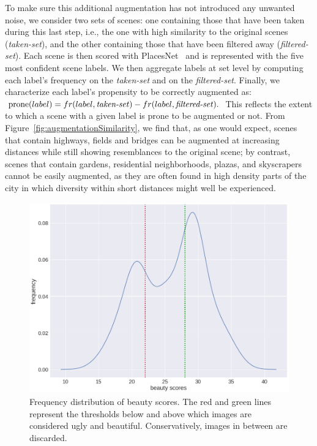 To make sure this additional augmentation has not introduced any unwanted noise, we consider  two sets of scenes: one containing those that have been taken during this last step, i.e., the one with high similarity to the original scenes (\emph{taken-set}), and the other containing those that have been filtered away (\emph{filtered-set}). Each scene is then scored with PlacesNet~\cite{zhou2014learning} and is represented with the five most confident scene labels. We then aggregate labels at set level by computing each label's frequency on the \emph{taken-set} %
and on the \emph{filtered-set}. Finally, we characterize each label's propensity to be correctly augmented as: 
$ \textrm{prone}(label)= fr(label,\textrm{\emph{taken-set}}) - fr(label,\textrm{\emph{filtered-set}}).$
This reflects the extent to which a scene with a given label is prone to be augmented or not. From Figure~\ref{fig:augmentationSimilarity}, we find that, as one would expect, scenes that contain highways, fields and bridges can be augmented at increasing distances while still showing resemblances to the original scene; by contrast, scenes that contain gardens, residential neighborhoods, plazas, and skyscrapers cannot be easily augmented, as they are often found in high density parts of the city in which diversity within short distances might well be experienced. 


\begin{figure}[t!]
	\centering
	\includegraphics[width=0.7\columnwidth]{Plot/Trueskill.png}
	\caption{Frequency distribution of beauty scores. The red and green lines represent the thresholds below and above which images are considered ugly and beautiful. Conservatively, images in between are discarded.}
	\label{fig:Trueskill}
\end{figure}


